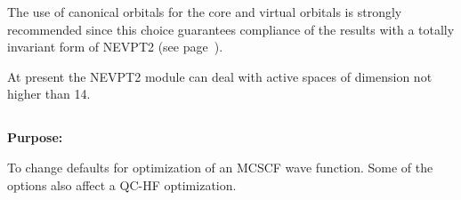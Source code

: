 


The use of canonical orbitals for the core and virtual orbitals is
strongly recommended since this choice guarantees compliance of the
results with a totally invariant form of NEVPT2 (see page~\pageref{ch:nevpt2}).

At present the NEVPT2 module can deal with active spaces of dimension
not higher than 14.

\pagebreak[3]
\subsection{\label{ref-optinp}}

{\bf Purpose:}

To change defaults for optimization of an MCSCF wave function.
Some of the options also affect a QC-HF optimization.

